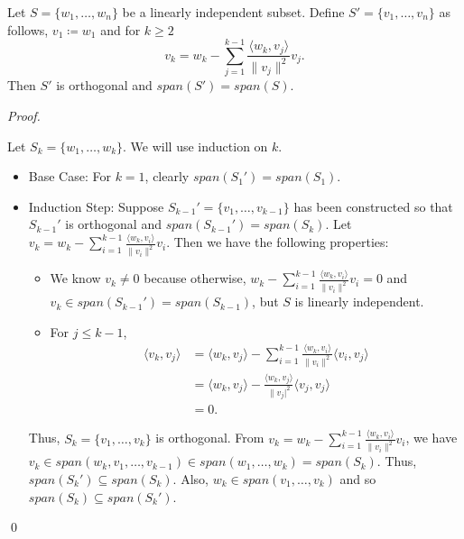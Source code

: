 \documentclass[12pt]{article}
\newenvironment{theorem}[2][Theorem]{\begin{trivlist}
\item[\hskip \labelsep {\bfseries #1}\hskip \labelsep {\bfseries #2.}]}{\end{trivlist}}
\newenvironment{sol}
    {\emph{Proof.}
    }
    {
    \qed
    }
\begin{document}
\begin{theorem}{6.4 (Graham-Schmidt algorithm)} Let $S = \{w_1, \dots, w_n\}$ be a linearly independent subset. Define $S' = \{v_1, \dots, v_n\}$ as follows, $v_1 \coloneqq w_1$ and for $k \geq 2$ $$v_k = w_k - \sum_{j = 1}^{k-1}\frac{\langle w_k, v_j \rangle}{\lVert v_j \rVert^2}v_j.$$ Then $S'$ is orthogonal and $span(S') = span(S)$.
\end{theorem}

\begin{sol}
Let $S_k = \{w_1, \dots, w_k\}$. We will use induction on $k$. 

\begin{itemize}
    \item Base Case: For $k = 1$, clearly $span(S_1') = span(S_1)$.
    
    \item Induction Step: Suppose $S_{k-1}' = \{v_1, \dots, v_{k-1}\}$ has been constructed so that $S_{k-1}'$ is orthogonal and $span(S_{k-1}') = span(S_k)$. Let $v_k = w_k - \sum_{i = 1}^{k-1} \frac{\langle w_k, v_i \rangle}{\lVert v_i \rVert^2}v_i$. Then we have the following properties: \begin{itemize}
        \item We know $v_k \neq 0$ because otherwise, $w_k - \sum_{i = 1}^{k-1} \frac{\langle w_k, v_i \rangle}{\lVert v_i \rVert^2}v_i = 0$ and $v_k \in span(S_{k-1}') = span(S_{k-1})$, but $S$ is linearly independent.
        
        \item For $j \leq k-1$, \begin{align*}
            \langle v_k, v_j \rangle &= \langle w_k, v_j \rangle - \sum_{i =1}^{k-1} \frac{\langle w_k, v_i \rangle}{\lVert v_i \rVert^2}\langle v_i, v_j \rangle \tag{Note, $\langle v_i, v_j \rangle = 0$ if $i \neq j$} \\
            &= \langle w_k, v_j \rangle - \frac{\langle w_k, v_j \rangle}{\lVert v_j \rvert^2}\langle v_j, v_j \rangle \tag{By inductive hypothesis} \\
            &= 0.
        \end{align*}
    \end{itemize}
    
    Thus, $S_k = \{v_1, \dots, v_k \}$ is orthogonal. From $v_k = w_k - \sum_{i = 1}^{k-1} \frac{\langle w_k, v_i \rangle}{\lVert v_i \rVert^2}v_i$, we have $v_k \in span(w_k, v_1, \dots, v_{k-1}) \in span(w_1, \dots, w_k) = span(S_k)$. Thus, $span(S_k') \subseteq span(S_k)$. Also, $w_k \in span(v_1, \dots, v_k)$ and so $span(S_k) \subseteq span(S_k')$.
\end{itemize}
\end{sol}
\end{document}
